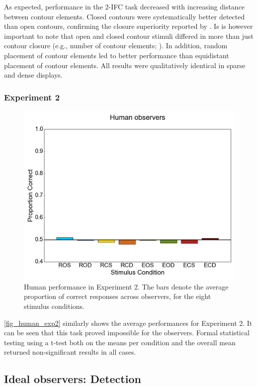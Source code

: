 \documentclass[12pt]{article}
\begin{document}
As expected, performance in the 2-IFC task decreased with increasing distance between contour elements. Closed contours were systematically better detected than open contours, confirming the closure superiority reported by . Is is however important to note that open and closed contour stimuli differed in more than just contour closure (e.g., number of contour elements; ). In addition, random placement of contour elements led to better performance than equidistant placement of contour elements. All results were qualitatively identical in sparse and dense displays.

\subsubsection{Experiment 2}

\begin{figure}[h!t]
\includegraphics{Figures/FIG_detect_data_exp2.png}
\caption{Human performance in Experiment 2. The bars denote the average proportion of correct responses across observers, for the eight stimulus conditions.}
\label{fig_human_exp2}
\end{figure}

\autoref{fig_human_exp2} similarly shows the average performances for Experiment 2. It can be seen that this task proved impossible for the observers. Formal statistical testing using a t-test both on the means per condition and the overall mean returned non-significant results in all cases.


\subsection{Ideal observers: Detection}\label{subsection_results_detect_ideal}
\end{document}
